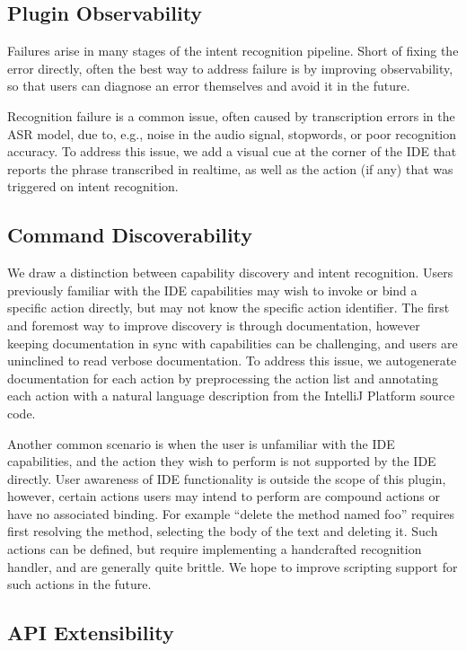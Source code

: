 \documentclass[conference]{IEEEtran}
\begin{document}
\subsection{Plugin Observability}

Failures arise in many stages of the intent recognition pipeline. Short of fixing the error directly, often the best way to address failure is by improving observability, so that users can diagnose an error themselves and avoid it in the future.

Recognition failure is a common issue, often caused by transcription errors in the ASR model, due to, e.g., noise in the audio signal, stopwords, or poor recognition accuracy. To address this issue, we add a visual cue at the corner of the IDE that reports the phrase transcribed in realtime, as well as the action (if any) that was triggered on intent recognition.

\subsection{Command Discoverability}

We draw a distinction between capability discovery and intent recognition. Users previously familiar with the IDE capabilities may wish to invoke or bind a specific action directly, but may not know the specific action identifier. The first and foremost way to improve discovery is through documentation, however keeping documentation in sync with capabilities can be challenging, and users are uninclined to read verbose documentation. To address this issue, we autogenerate documentation for each action by preprocessing the action list and annotating each action with a natural language description from the IntelliJ Platform source code.

Another common scenario is when the user is unfamiliar with the IDE capabilities, and the action they wish to perform is not supported by the IDE directly. User awareness of IDE functionality is outside the scope of this plugin, however, certain actions users may intend to perform are compound actions or have no associated binding. For example ``delete the method named \textlangle foo\textrangle'' requires first resolving the method, selecting the body of the text and deleting it. Such actions can be defined, but require implementing a handcrafted recognition handler, and are generally quite brittle. We hope to improve scripting support for such actions in the future.

\subsection{API Extensibility}
\end{document}
